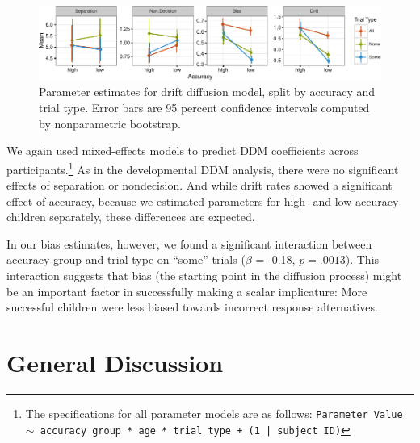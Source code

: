 \documentclass[10pt, letterpaper]{article}
\newenvironment{CodeChunk}{}{}
\begin{document}
\begin{CodeChunk}
\begin{figure}[!tb]

{\centering \includegraphics{figs/param_plot-1} 

}

\caption[Parameter estimates for drift diffusion model, split by accuracy and trial type]{Parameter estimates for drift diffusion model, split by accuracy and trial type. Error bars are 95 percent confidence intervals computed by nonparametric bootstrap.}\label{fig:param_plot}
\end{figure}
\end{CodeChunk}

We again used mixed-effects models to predict DDM coefficients across
participants.\footnote{The specifications for all parameter models are as follows: \texttt{Parameter Value $\sim$ accuracy group * age * trial type + (1 | subject ID)}}
As in the developmental DDM analysis, there were no significant effects
of separation or nondecision. And while drift rates showed a significant
effect of accuracy, because we estimated parameters for high- and
low-accuracy children separately, these differences are expected.

In our bias estimates, however, we found a significant interaction
between accuracy group and trial type on ``some'' trials (\(\beta\) =
-0.18, \(p = .0013\)). This interaction suggests that bias (the starting
point in the diffusion process) might be an important factor in
successfully making a scalar implicature: More successful children were
less biased towards incorrect response alternatives.

\section{General Discussion}\label{general-discussion}
\end{document}
